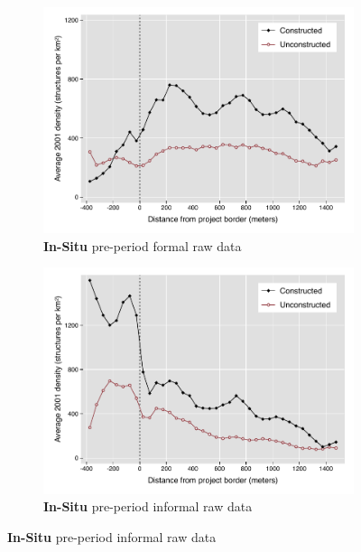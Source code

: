 \documentclass[12pt]{article}
\begin{document}
\begin{figure}
\begin{subfigure}[b]{0.48\textwidth}
        \end{subfigure}
        \begin{subfigure}[b]{0.48\textwidth}
                    \caption[Network2]%
            {{\footnotesize \textbf{In-Situ} pre-period formal  raw data}}   
            \label{fig:prefor}
            \centering
            \includegraphics[width=\textwidth,trim={0.3cm .3cm 0.1cm 0cm}, clip=true]{figures/bblu_for_pre_means_4_2_spk.pdf}

        \end{subfigure}
        \hfill
        \begin{subfigure}[b]{0.48\textwidth}  
                    \caption[]%
            {{\footnotesize \textbf{In-Situ} pre-period informal  raw data}}     
            \label{fig:preinf}
            \centering 
            \includegraphics[width=\textwidth,trim={0.3cm .3cm 0.1cm 0cm}, clip=true]{figures/bblu_inf_pre_means_4_2_spk.pdf}


\end{subfigure}
\end{figure}
\end{document}
